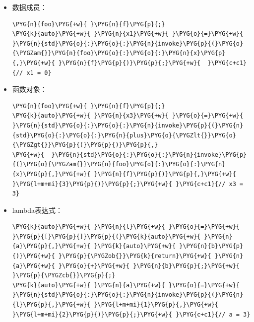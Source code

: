 \begin{itemize}

\item 数据成员：



\begin{codeblockbg}
\begin{Verbatim}[commandchars=\\\{\},breaklines=true,breakanywhere=true,fontsize=\codefont,xleftmargin=17bp]
\PYG{n}{foo}\PYG{+w}{ }\PYG{n}{f}\PYG{p}{;}
\PYG{k}{auto}\PYG{+w}{ }\PYG{n}{x1}\PYG{+w}{ }\PYG{o}{=}\PYG{+w}{ }\PYG{n}{std}\PYG{o}{:}\PYG{o}{:}\PYG{n}{invoke}\PYG{p}{(}\PYG{o}{\PYGZam{}}\PYG{n}{foo}\PYG{o}{:}\PYG{o}{:}\PYG{n}{x}\PYG{p}{,}\PYG{+w}{ }\PYG{n}{f}\PYG{p}{)}\PYG{p}{;}\PYG{+w}{  }\PYG{c+c1}{// x1 = 0}
\end{Verbatim}
\end{codeblockbg}



\item 函数对象：



\begin{codeblockbg}
\begin{Verbatim}[commandchars=\\\{\},breaklines=true,breakanywhere=true,fontsize=\codefont,xleftmargin=17bp]
\PYG{n}{foo}\PYG{+w}{ }\PYG{n}{f}\PYG{p}{;}
\PYG{k}{auto}\PYG{+w}{ }\PYG{n}{x3}\PYG{+w}{ }\PYG{o}{=}\PYG{+w}{ }\PYG{n}{std}\PYG{o}{:}\PYG{o}{:}\PYG{n}{invoke}\PYG{p}{(}\PYG{n}{std}\PYG{o}{:}\PYG{o}{:}\PYG{n}{plus}\PYG{o}{\PYGZlt{}}\PYG{o}{\PYGZgt{}}\PYG{p}{(}\PYG{p}{)}\PYG{p}{,}
\PYG{+w}{  }\PYG{n}{std}\PYG{o}{:}\PYG{o}{:}\PYG{n}{invoke}\PYG{p}{(}\PYG{o}{\PYGZam{}}\PYG{n}{foo}\PYG{o}{:}\PYG{o}{:}\PYG{n}{x}\PYG{p}{,}\PYG{+w}{ }\PYG{n}{f}\PYG{p}{)}\PYG{p}{,}\PYG{+w}{ }\PYG{l+m+mi}{3}\PYG{p}{)}\PYG{p}{;}\PYG{+w}{ }\PYG{c+c1}{// x3 = 3}
\end{Verbatim}
\end{codeblockbg}



\item lambda表达式：



\begin{codeblockbg}
\begin{Verbatim}[commandchars=\\\{\},breaklines=true,breakanywhere=true,fontsize=\codefont,xleftmargin=17bp]
\PYG{k}{auto}\PYG{+w}{ }\PYG{n}{l}\PYG{+w}{ }\PYG{o}{=}\PYG{+w}{ }\PYG{p}{[}\PYG{p}{]}\PYG{p}{(}\PYG{k}{auto}\PYG{+w}{ }\PYG{n}{a}\PYG{p}{,}\PYG{+w}{ }\PYG{k}{auto}\PYG{+w}{ }\PYG{n}{b}\PYG{p}{)}\PYG{+w}{ }\PYG{p}{\PYGZob{}}\PYG{k}{return}\PYG{+w}{ }\PYG{n}{a}\PYG{+w}{ }\PYG{o}{+}\PYG{+w}{ }\PYG{n}{b}\PYG{p}{;}\PYG{+w}{ }\PYG{p}{\PYGZcb{}}\PYG{p}{;}
\PYG{k}{auto}\PYG{+w}{ }\PYG{n}{a}\PYG{+w}{ }\PYG{o}{=}\PYG{+w}{ }\PYG{n}{std}\PYG{o}{:}\PYG{o}{:}\PYG{n}{invoke}\PYG{p}{(}\PYG{n}{l}\PYG{p}{,}\PYG{+w}{ }\PYG{l+m+mi}{1}\PYG{p}{,}\PYG{+w}{ }\PYG{l+m+mi}{2}\PYG{p}{)}\PYG{p}{;}\PYG{+w}{ }\PYG{c+c1}{// a = 3}
\end{Verbatim}
\end{codeblockbg}


\end{itemize}
